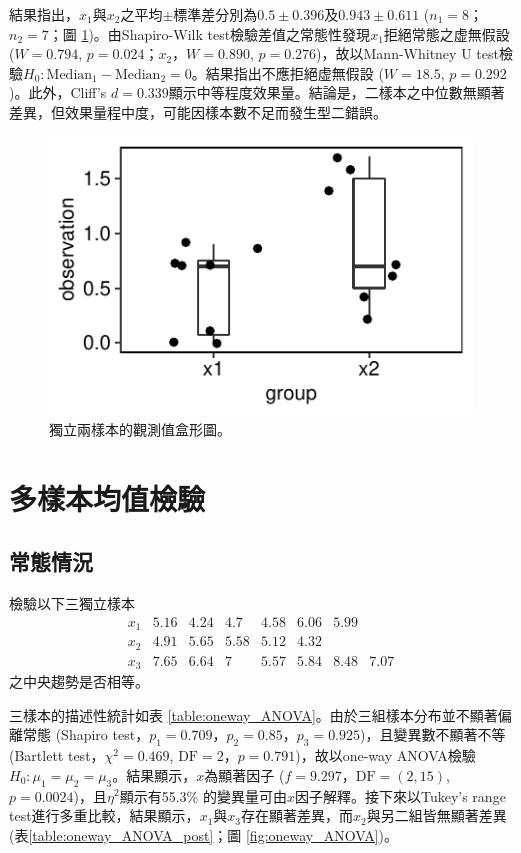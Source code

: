\documentclass[12pt, a4paper, onecolumn]{article}
\begin{document}
結果指出，$x_1$與$x_2$之平均$\pm$標準差分別為$0.5 \pm 0.396$及$0.943 \pm 0.611$ ($n_1 = 8$；$n_2=7$；圖 \ref{fig:non-normal_independent_test})。由Shapiro-Wilk test檢驗差值之常態性發現$x_1$拒絕常態之虚無假設 ($W = 0.794$, $p = 0.024$；$x_2$，$W = 0.890$, $p = 0.276$)，故以Mann-Whitney U test檢驗$H_0: \text{Median}_1 - \text{Median}_2 = 0$。結果指出不應拒絕虚無假設 ($W = 18.5$, $p = 0.292$)。此外，Cliff's $d=0.339$顯示中等程度效果量。結論是，二樣本之中位數無顯著差異，但效果量程中度，可能因樣本數不足而發生型二錯誤。
\begin{figure}
	\centering
	\includegraphics[]{non-normal_independent_test.pdf}
	\caption{獨立兩樣本的觀測值盒形圖。}
	\label{fig:non-normal_independent_test}
\end{figure}

\section{多樣本均值檢驗}
\subsection{常態情況}
檢驗以下三獨立樣本
\[
\begin{matrix}
x_1 & 5.16 & 4.24 & 4.7 & 4.58 & 6.06 & 5.99 &  \\
x_2 & 4.91 & 5.65 & 5.58 & 5.12 & 4.32 & & \\
x_3 & 7.65 & 6.64 & 7 & 5.57 & 5.84 & 8.48 & 7.07
\end{matrix}
\]
之中央趨勢是否相等。

三樣本的描述性統計如表 \ref{table:oneway_ANOVA}。由於三組樣本分布並不顯著偏離常態 (Shapiro test，$p_1 = 0.709$，$p_2 = 0.85$，$p_3 = 0.925$)，且變異數不顯著不等 (Bartlett test，$\chi^2 = 0.469$, $\text{DF} = 2$，$p = 0.791$)，故以one-way ANOVA檢驗$H_0:\mu_1 = \mu_2 = \mu_3$。結果顯示，$x$為顯著因子 ($f = 9.297$，$\text{DF} = (2, 15)$, $p = 0.0024$)，且$\eta^2$顯示有55.3\% 的變異量可由$x$因子解釋。接下來以Tukey's range test進行多重比較，結果顯示，$x_1$與$x_3$存在顯著差異，而$x_2$與另二組皆無顯著差異 (表\ref{table:oneway_ANOVA_post}；圖 \ref{fig:oneway_ANOVA})。
\end{document}
